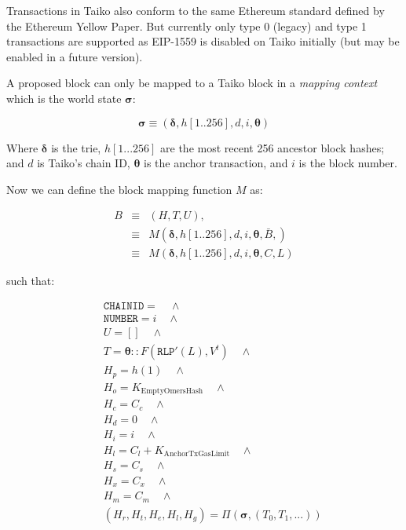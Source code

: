 \documentclass[9pt,oneside]{amsart}
\begin{document}
\begin{multicols}{2}
Transactions in Taiko also conform to the same Ethereum standard defined by the Ethereum Yellow Paper. But currently only type 0 (legacy) and type 1 transactions are supported as EIP-1559 is disabled on Taiko initially (but may be enabled in a future version).

A proposed block can only be mapped to a Taiko block in a \textit{mapping context} which is the world state $\boldsymbol{\sigma}$:

$$\boldsymbol{\sigma} \equiv (\boldsymbol{\delta}, h[1..256], d, i, \boldsymbol{\theta})$$

Where $\boldsymbol{\delta}$ is the trie, $h[1...256]$ are the most recent 256 ancestor block hashes; and $d$ is Taiko's chain ID, $\boldsymbol{\theta}$ is the anchor transaction, and $i$ is the block number.

Now we can define the block mapping function $M$ as:

\begin{eqnarray}
B & \equiv & (H, T, U), \\
\nonumber & \equiv &  M(\boldsymbol{\delta}, h[1..256], {d}, i, \boldsymbol{\theta}, \bar{B}, )  \\
\nonumber & \equiv & M(\boldsymbol{\delta}, h[1..256], {d}, i, \boldsymbol{\theta}, C, L)
\end{eqnarray}


such that:

\begin{eqnarray}
& & \texttt{CHAINID}  = \quad \wedge \\
\nonumber& & \texttt{NUMBER} = {i} \quad \wedge \\
\nonumber& & U = [] \quad \wedge \\
\nonumber& & T =  \boldsymbol{\theta}::F(\texttt{RLP}'(L), V^t) \quad \wedge  \\
\nonumber& & H_p =  h(1) \quad \wedge \\
\nonumber& & H_o =   K_{\mathrm{EmptyOmersHash}} \quad \wedge \\
\nonumber& & H_c =   C_c \quad \wedge \\
\nonumber& & H_d =   0 \quad \wedge \\
\nonumber& & H_i =   i \quad \wedge \\
\nonumber& & H_l =   C_l + K_{\mathrm{AnchorTxGasLimit}} \quad \wedge \\
\nonumber& & H_s =   C_s \quad \wedge \\
\nonumber& & H_x =   C_x \quad \wedge \\
\nonumber& & H_m =   C_m \quad \wedge \\
\nonumber& & (H_r, H_t, H_e, H_l, H_g) =   \Pi(\boldsymbol{\sigma}, (T_0, T_1, ...))
\end{eqnarray}


\end{multicols}
\end{document}
